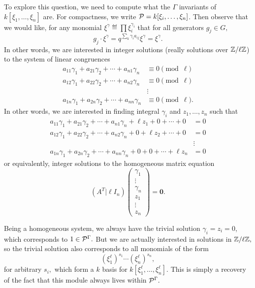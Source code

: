 \documentclass [11pt, proquest] {uwthesis}[2020/02/24]
\begin{document}
{    To explore this question, we need to compute what the $\Gamma$ invariants of $k[\xi_1,\dots,\xi_n]$ are. For compactness, we write $\mathcal{P}=k[\xi_i,\dots,\xi_n]$. Then observe that we would like, for any monomial $\xi^\gamma\eqdef \prod \xi_i^{\gamma_i}$ that for all generators $g_j\in G,$
    \[g_j\cdot \xi^\gamma=q^{\sum_k \gamma_ia_{ij}}\xi^\gamma=\xi^\gamma.\]
    In other words, we are interested in integer solutions (really solutions over $\mathbb{Z}/\ell\mathbb{Z}$) to the system of linear congruences
    \begin{align*}
        a_{11}\gamma_1 + a_{21}\gamma_2 + \cdots + a_{n1}\gamma_n &\equiv 0 \pmod{\ell}\\
        a_{12}\gamma_1 + a_{22}\gamma_2 + \cdots + a_{n2}\gamma_n &\equiv 0 \pmod{\ell}\\
        &\vdots\\
        a_{1n}\gamma_1 + a_{2n}\gamma_2 + \cdots + a_{nn}\gamma_n &\equiv 0 \pmod{\ell}.
    \end{align*}
    In other words, we are interested in finding integral $\gamma_i$ and $z_1,\dots,z_n$ such that
    \begin{align*}
        a_{11}\gamma_1 + a_{21}\gamma_2 + \cdots + a_{n1}\gamma_n + \ell z_1 + 0 + \cdots + 0 &=0\\
        a_{12}\gamma_1 + a_{22}\gamma_2 + \cdots + a_{n2}\gamma_n + 0 + \ell z_2 + \cdots + 0 &=0\\
        &\vdots\\
        a_{1n}\gamma_1 + a_{2n}\gamma_2 + \cdots + a_{nn}\gamma_n + 0 + 0 + \cdots + \ell z_n &=0
    \end{align*}
    or equivalently, integer solutions to the homogeneous matrix equation
    \[(A^T|\ell I_n)\begin{pmatrix}
        \gamma_1\\ \vdots \\ \gamma_n \\ z_1 \\ \vdots \\ z_n
    \end{pmatrix}=\mathbf 0.\]

    Being a homogeneous system, we always have the trivial solution $\gamma_i=z_i=0$, which corresponds to $1\in \mathcal{P}^\Gamma.$ But we are actually interested in solutions in $\mathbb{Z}/\ell\mathbb{Z},$ so the trivial solution also corresponds to all monomials of the form
    \[(\xi_1^\ell)^{s_1}\cdots (\xi_n^\ell)^{s_n},\]
    for arbitrary $s_i,$ which form a $k$ basis for $k[\xi_1^\ell,\dots,\xi_n^\ell].$ This is simply a recovery of the fact that this module always lives within $\mathcal{P}^\Gamma.$
}
\end{document}
